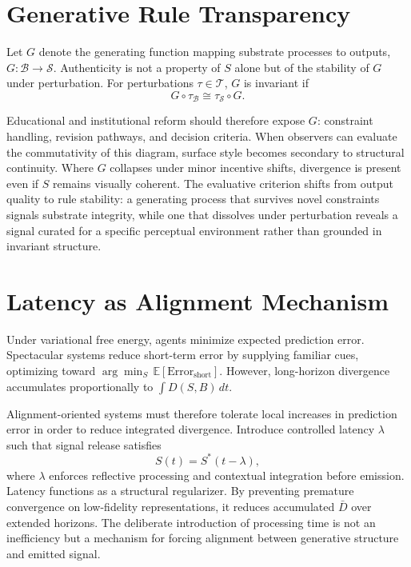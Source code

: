 \documentclass[11pt]{article}
\begin{document}
\section{Generative Rule Transparency}

Let $G$ denote the generating function mapping substrate processes to outputs, $G : \mathcal{B} \to \mathcal{S}$. Authenticity is not a property of $S$ alone but of the stability of $G$ under perturbation. For perturbations $\tau \in \mathcal{T}$, $G$ is invariant if
\[
G \circ \tau_{\mathcal{B}} \cong \tau_{\mathcal{S}} \circ G.
\]

Educational and institutional reform should therefore expose $G$: constraint handling, revision pathways, and decision criteria. When observers can evaluate the commutativity of this diagram, surface style becomes secondary to structural continuity. Where $G$ collapses under minor incentive shifts, divergence is present even if $S$ remains visually coherent. The evaluative criterion shifts from output quality to rule stability: a generating process that survives novel constraints signals substrate integrity, while one that dissolves under perturbation reveals a signal curated for a specific perceptual environment rather than grounded in invariant structure.

\section{Latency as Alignment Mechanism}

Under variational free energy, agents minimize expected prediction error. Spectacular systems reduce short-term error by supplying familiar cues, optimizing toward $\arg\min_S \,\mathbb{E}[\mathrm{Error}_{\mathrm{short}}]$. However, long-horizon divergence accumulates proportionally to $\int D(S,B)\, dt$.

Alignment-oriented systems must therefore tolerate local increases in prediction error in order to reduce integrated divergence. Introduce controlled latency $\lambda$ such that signal release satisfies
\[
S(t) = S^*(t - \lambda),
\]
where $\lambda$ enforces reflective processing and contextual integration before emission. Latency functions as a structural regularizer. By preventing premature convergence on low-fidelity representations, it reduces accumulated $\bar{D}$ over extended horizons. The deliberate introduction of processing time is not an inefficiency but a mechanism for forcing alignment between generative structure and emitted signal.
\end{document}
